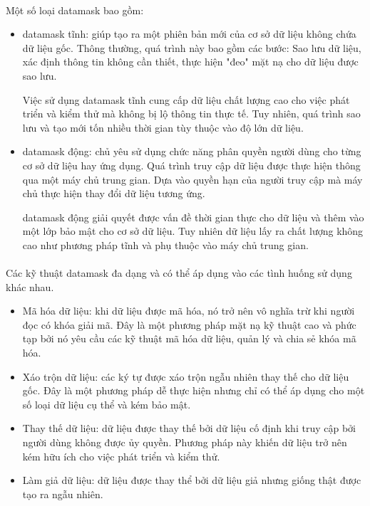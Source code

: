 \paragraph{}
Một số loại \gls{datamask} bao gồm:
\begin{itemize}
	\item \Gls{datamask} tĩnh: giúp tạo ra một phiên bản mới của cơ sở dữ liệu không chứa dữ liệu gốc. Thông thường, quá trình này bao gồm các bước: Sao lưu dữ liệu, xác định thông tin không cần thiết, thực hiện "đeo" mặt nạ cho dữ liệu được sao lưu.
	
	Việc sử dụng \gls{datamask} tĩnh cung cấp dữ liệu chất lượng cao cho việc phát triển và kiểm thử mà không bị lộ thông tin thực tế. Tuy nhiên, quá trình sao lưu và tạo mới tốn nhiều thời gian tùy thuộc vào độ lớn dữ liệu.
	
	\item \Gls{datamask} động: chủ yêu sử dụng chức năng phân quyền người dùng cho từng cơ sở dữ liệu hay ứng dụng. Quá trình truy cập dữ liệu được thực hiện thông qua một máy chủ trung gian. Dựa vào quyền hạn của người truy cập mà máy chủ thực hiện thay đổi dữ liệu tương ứng.
	
	\Gls{datamask} động giải quyết được vấn đề thời gian thực cho dữ liệu và thêm vào một lớp bảo mật cho cơ sở dữ liệu. Tuy nhiên dữ liệu lấy ra chất lượng không cao như phương pháp tĩnh và phụ thuộc vào máy chủ trung gian.
\end{itemize}

\paragraph{}
Các kỹ thuật \gls{datamask} đa dạng và có thể áp dụng vào các tình huống sử dụng khác nhau.
\begin{itemize}
	\item Mã hóa dữ liệu: khi dữ liệu được mã hóa, nó trở nên vô nghĩa trừ khi người đọc có khóa giải mã. Đây là một phương pháp mặt nạ kỹ thuật cao và phức tạp bởi nó yêu cầu các kỹ thuật mã hóa dữ liệu, quản lý và chia sẻ khóa mã hóa.
	\item Xáo trộn dữ liệu: các ký tự được xáo trộn ngẫu nhiên thay thế cho dữ liệu gốc. Đây là một phương pháp dễ thực hiện nhưng chỉ có thể áp dụng cho một số loại dữ liệu cụ thể và kém bảo mật.
	\item Thay thế dữ liệu: dữ liệu được thay thế bởi dữ liệu cố định khi truy cập bởi người dùng không được ủy quyền. Phương pháp này khiến dữ liệu trở nên kém hữu ích cho việc phát triển và kiểm thử.
	\item Làm giả dữ liệu: dữ liệu được thay thể bởi dữ liệu giả nhưng giống thật được tạo ra ngẫu nhiên.
\end{itemize}

